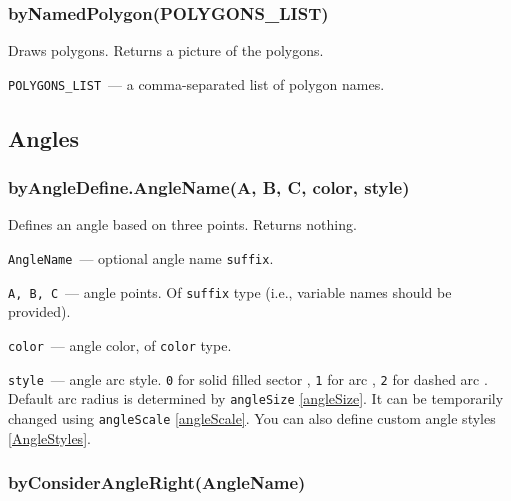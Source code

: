 \subsubsection{byNamedPolygon(POLYGONS\_LIST)}\label{byNamedPolygon}
	
	Draws polygons. Returns a picture of the polygons.
	
	\texttt{POLYGONS\_LIST}~— a comma-separated list of polygon names.


\subsection{Angles}

\subsubsection{byAngleDefine.AngleName(A, B, C, color, style)}\label{byAngleDefine}
	
	
	Defines an angle based on three points. Returns nothing.

	\texttt{AngleName}~— optional angle name \texttt{suffix}.
		
	\texttt{A, B, C}~— angle points. Of \texttt{suffix} type (i.e., variable names should be provided).
	
	\texttt{color}~— angle color, of \texttt{color} type.
	
	\texttt{style}~— angle arc style. \texttt{0} for solid filled sector , \texttt{1} for arc , \texttt{2} for dashed arc . Default arc radius is determined by \texttt{angleSize} \ref{angleSize}. It can be temporarily changed using \texttt{angleScale} \ref{angleScale}. You can also define custom angle styles \ref{AngleStyles}. 
	
\subsubsection{byConsiderAngleRight(AngleName)}\label{byConsiderAngleRight}

